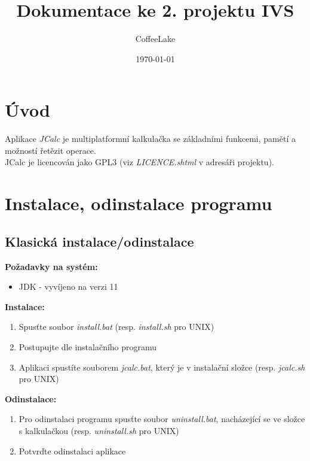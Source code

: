 \documentclass[a4paper, 11pt]{article}
\title{Dokumentace ke 2. projektu IVS}
\author{CoffeeLake}
\date{\today}
\begin{document}
	
\maketitle
\tableofcontents


\newpage

\section{Úvod}

Aplikace \emph{JCalc} je multiplatformní kalkulačka se základními funkcemi, pamětí a možností řetězit operace.\\
JCalc je licencován jako GPL3 (viz \emph{LICENCE.shtml} v adresáři projektu).


\section{Instalace, odinstalace programu}

\subsection{Klasická instalace/odinstalace}

\textbf{Požadavky na systém:}

\begin{itemize}
    \item JDK - vyvíjeno na verzi 11
\end{itemize}

\noindent
\textbf{Instalace:}

\begin{enumerate}
    \item Spusťte soubor \emph{install.bat} (resp. \emph{install.sh} pro UNIX)
    \item Postupujte dle instalačního programu
    \item Aplikaci spustíte souborem \emph{jcalc.bat}, který je v instalační složce (resp. \emph{jcalc.sh} pro UNIX)
\end{enumerate}

\noindent
\textbf{Odinstalace:}

\begin{enumerate}
    \item Pro odinstalaci programu spusťte soubor \emph{uninstall.bat}, nacházející se ve složce s kalkulačkou (resp. \emph{uninstall.sh} pro UNIX)
    \item Potvrďte odinstalaci aplikace
\end{enumerate}
\end{document}
